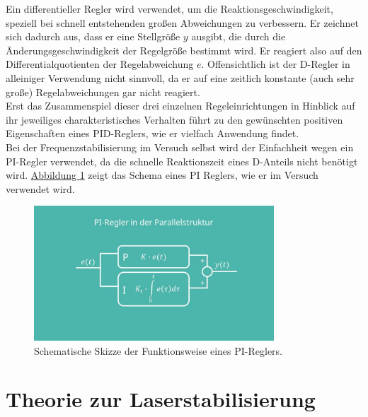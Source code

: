 \documentclass[
class=book,
accentcolor=1b,
custommargins=geometry,
fontsize=11pt,
thesis={type=Versuchsanleitung},
ruledheaders=all,
headline=false,
instbox=false,
marginpar=false,
title=small,
ignore-missing-data=true,
twoside=false,
logofile=apqdesign/tuda_logo.pdf,
pdfa=false %
]{apqpub}
\begin{document}
			Ein differentieller Regler wird verwendet, um die Reaktionsgeschwindigkeit, speziell bei schnell entstehenden großen Abweichungen zu verbessern. 
			Er zeichnet sich dadurch aus, dass er eine Stellgröße $y$ ausgibt, die durch die Änderungsgeschwindigkeit der Regelgröße bestimmt wird. 
			Er reagiert also auf den Differentialquotienten der Regelabweichung $e$. 
			Offensichtlich ist der D-Regler in alleiniger Verwendung nicht sinnvoll, da er auf eine zeitlich konstante (auch sehr große) Regelabweichungen gar nicht reagiert.\\
			Erst das Zusammenspiel dieser drei einzelnen Regeleinrichtungen in Hinblick auf ihr jeweiliges charakteristisches Verhalten führt zu den gewünschten positiven Eigenschaften eines PID-Reglers, wie er vielfach Anwendung findet. \cite{PID}\\
			Bei der Frequenzstabilisierung im Versuch selbst wird der Einfachheit wegen ein PI-Regler verwendet, da die schnelle Reaktionszeit eines D-Anteils nicht benötigt wird. 
			\hyperref[fig:PID]{Abbildung \ref{fig:PID}} zeigt das Schema eines PI Reglers, wie er im Versuch verwendet wird.
			\begin{figure}[htb!]
				\centering
				\includegraphics[width=0.8\textwidth]{graphics/PI-Regler.jpg}
				\caption{Schematische Skizze der Funktionsweise eines PI-Reglers.}
				\label{fig:PID}
			\end{figure}
			
			\chapter{Theorie zur Laserstabilisierung}
			
\end{document}

